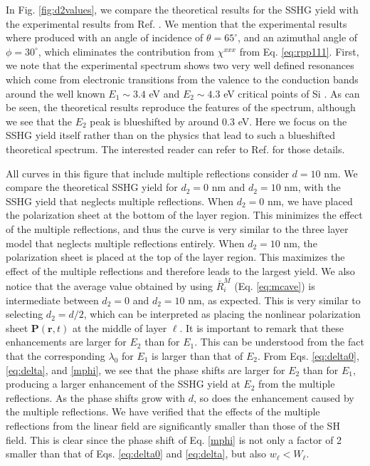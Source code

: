 In Fig. \ref{fig:d2values}, we compare the theoretical results for the SSHG yield with the experimental results from Ref. \cite{mejiaPRB02}. We mention that the experimental results where produced with an angle of incidence of $\theta=65^\circ$, and an azimuthal angle of $\phi=30^\circ$, which eliminates the contribution from $\chi^{xxx}$ from Eq. \eqref{eq:rpp111}. First, we note that the experimental spectrum shows two very well defined resonances which come from electronic transitions from the valence to the conduction bands around the well known $E_{1}\sim 3.4$ eV and $E_{2}\sim 4.3$ eV critical points of Si \cite{yubook}. As can be seen, the theoretical results reproduce the features of the spectrum, although we see that the $E_{2}$ peak is blueshifted by around 0.3 eV. Here we focus on the SSHG yield itself rather than on the physics that lead to such a blueshifted theoretical spectrum. The interested reader can refer to Ref. \cite{andersonPRB16} for those details.

All curves in this figure that include multiple reflections consider $d = 10$ nm. We compare the theoretical SSHG yield for $d_{2} = 0$ nm and $d_{2} = 10$ nm, with the SSHG yield that neglects multiple reflections. When $d_{2} = 0$ nm, we have placed the polarization sheet at the bottom of the layer region. This minimizes the effect of the multiple reflections, and thus the curve is very similar to the three layer model that neglects multiple reflections entirely. When $d_{2} = 10$ nm, the polarization sheet is placed at the top of the layer region. This maximizes the effect of the multiple reflections and therefore leads to the largest yield. We also notice that the average value obtained by using $\bar{R}^{M}_{i}$ (Eq. \eqref{eq:mcave}) is intermediate between $d_{2} = 0$ and $d_{2} = 10$ nm, as expected. This is very similar to selecting $d_{2} = d/2$, which can be interpreted as placing the nonlinear polarization sheet $\mathbf{P}(\mathbf{r},t)$ at the middle of layer $\ell$. It is important to remark that these enhancements are larger for $E_{2}$ than for $E_{1}$. This can be understood from the fact that the corresponding $\lambda_{0}$ for $E_{1}$ is larger than that of $E_{2}$. From Eqs. \eqref{eq:delta0}, \eqref{eq:delta}, and \eqref{mphi}, we see that the phase shifts are larger for $E_{2}$ than for $E_{1}$, producing a larger enhancement of the SSHG yield at $E_{2}$ from the multiple reflections. As the phase shifts grow with $d$, so does the enhancement caused by the multiple reflections. We have verified that the effects of the multiple reflections from the linear field are significantly smaller than those of the SH field. This is clear since the phase shift of Eq. \eqref{mphi} is not only a factor of 2 smaller than that of Eqs. \eqref{eq:delta0} and \eqref{eq:delta}, but also $w_\ell < W_\ell$.

